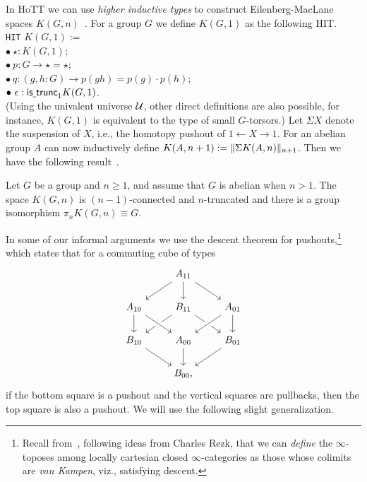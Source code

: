 In HoTT we can use \emph{higher inductive types} to construct Eilenberg-MacLane spaces $K(G,n)$~\cite{FinsterLicata}. For a group $G$ we define $K(G,1)$ as the following HIT.\\
\indent \texttt{HIT} $K(G,1) :=$ \\
\indent $\bullet\ \star : K(G,1)$; \\
\indent $\bullet\ p : G \to \star=\star$; \\
\indent $\bullet\ q : (g,h : G) \to p(gh) = p(g) \cdot p(h)$; \\
\indent $\bullet\ \epsilon : \istrunc{1}{K(G,1)}$. \\
(Using the univalent universe $\UU$, other direct definitions are
also possible, for instance, $K(G,1)$ is equivalent to the type of
small $G$-torsors.)
Let $\Sigma X$ denote the suspension of $X$, i.e., the homotopy pushout of $1\leftarrow X\to 1$. For an abelian group $A$ can now inductively define $K(A,n+1):=\trunc{n+1}{\Sigma K(A,n)}$. Then we have the following result~\cite{FinsterLicata}.

\begin{thm}\label{thm:EM-spaces}
  Let $G$ be a group and $n\geq 1$, and assume that $G$ is abelian
  when $n>1$. The space $K(G,n)$ is $(n-1)$-connected and
  $n$-truncated and there is a group isomorphism $\pi_nK(G,n) \equiv G$.
\end{thm}


In some of our informal arguments we use the descent theorem for
pushouts,\footnote{Recall from~\cite[\S6.1.3]{Lurie09}, following
  ideas from Charles Rezk, that we can
  \emph{define} the $\infty$-toposes among locally cartesian closed
  $\infty$-categories as those whose colimits are \emph{van Kampen},
  viz., satisfying descent.}
which states that for a commuting cube of types
\begin{equation}\label{eq:cube_higher_groups}
\begin{tikzcd}
& A_{11} \arrow[dl] \arrow[dr] \arrow[d] \\
A_{10} \arrow[d] & B_{11} \arrow[dl] \arrow[dr] & A_{01} \arrow[dl,crossing over] \arrow[d] \\
B_{10} \arrow[dr] & A_{00} \arrow[d] \arrow[from=ul,crossing over] & B_{01} \arrow[dl] \\
& B_{00},
\end{tikzcd}
\end{equation}
if the bottom square is a pushout and the vertical squares are pullbacks, then the top square is also a pushout. We will use the following slight generalization.

